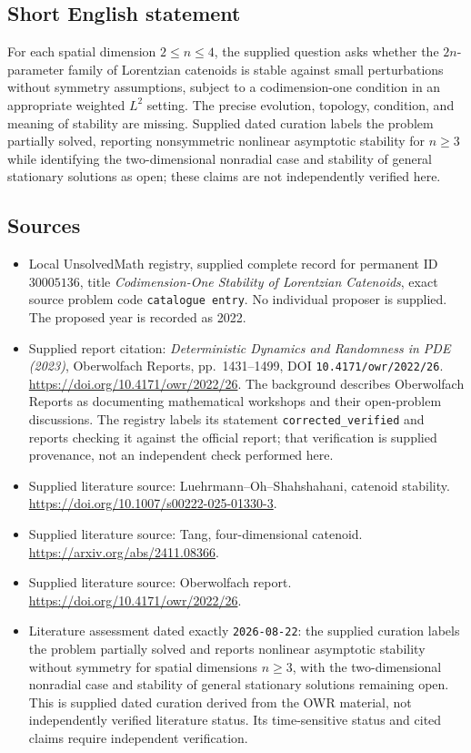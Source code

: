 \documentclass[11pt]{article}
\begin{document}
\subsection{Short English statement}
For each spatial dimension \(2\leq n\leq4\), the supplied question asks whether the \(2n\)-parameter family of Lorentzian catenoids is stable against small perturbations without symmetry assumptions, subject to a codimension-one condition in an appropriate weighted \(L^2\) setting. The precise evolution, topology, condition, and meaning of stability are missing. Supplied dated curation labels the problem partially solved, reporting nonsymmetric nonlinear asymptotic stability for \(n\geq3\) while identifying the two-dimensional nonradial case and stability of general stationary solutions as open; these claims are not independently verified here.
\subsection{Sources}
\begin{itemize}
\item Local UnsolvedMath registry, supplied complete record for permanent ID \(30005136\), title \emph{Codimension-One Stability of Lorentzian Catenoids}, exact source problem code \texttt{catalogue entry}. No individual proposer is supplied. The proposed year is recorded as 2022.
\item Supplied report citation: \emph{Deterministic Dynamics and Randomness in PDE (2023)}, Oberwolfach Reports, pp.\ 1431--1499, DOI \texttt{10.4171/owr/2022/26}. \url{https://doi.org/10.4171/owr/2022/26}. The background describes Oberwolfach Reports as documenting mathematical workshops and their open-problem discussions. The registry labels its statement \texttt{corrected\_verified} and reports checking it against the official report; that verification is supplied provenance, not an independent check performed here.
\item Supplied literature source: Luehrmann--Oh--Shahshahani, catenoid stability. \url{https://doi.org/10.1007/s00222-025-01330-3}.
\item Supplied literature source: Tang, four-dimensional catenoid. \url{https://arxiv.org/abs/2411.08366}.
\item Supplied literature source: Oberwolfach report. \url{https://doi.org/10.4171/owr/2022/26}.
\item Literature assessment dated exactly \texttt{2026-08-22}: the supplied curation labels the problem partially solved and reports nonlinear asymptotic stability without symmetry for spatial dimensions \(n\geq3\), with the two-dimensional nonradial case and stability of general stationary solutions remaining open. This is supplied dated curation derived from the OWR material, not independently verified literature status. Its time-sensitive status and cited claims require independent verification.
\end{itemize}
\end{document}
